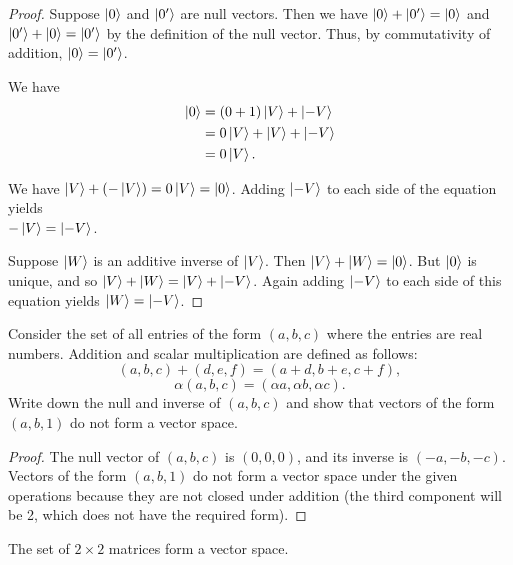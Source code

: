 \begin{enumerate}
    \item[] \begin{proof}
        \item[(a)] Suppose $\ket{0}$ and $\ket{0'}$ are null vectors. Then we have $\ket{0} + \ket{0'} = \ket{0}$ and $\ket{0'} + \ket{0} = \ket{0'}$ by the definition of the null vector. Thus, by commutativity of addition, $\ket{0} = \ket{0'}$.
        \item[(b)] We have
        \begin{align*}
            \ket{0} &= (0 + 1)\ket{V} + \ket{-V} \\
            &= 0\ket{V} + \ket{V} + \ket{-V} \\
            &= 0\ket{V}.
        \end{align*}
        \item[(c)] We have $\ket{V} + (-\ket{V}) = 0\ket{V} = \ket{0}$. Adding $\ket{-V}$ to each side of the equation yields \\$-\ket{V} = \ket{-V}$.
        \item[(d)] Suppose $\ket{W}$ is an additive inverse of $\ket{V}$. Then $\ket{V} + \ket{W} = \ket{0}$. But $\ket{0}$ is unique, and so $\ket{V} + \ket{W} = \ket{V} + \ket{-V}$. Again adding $\ket{-V}$ to each side of this equation yields $\ket{W} = \ket{-V} $.
    \end{proof}
\end{enumerate}

\begin{exercise}
Consider the set of all entries of the form $(a,b,c)$ where the entries are real numbers. Addition and scalar multiplication are defined as follows: $$(a, b, c) + (d, e, f) = (a + d, b + e, c + f),$$ $$\alpha(a, b, c) = (\alpha a, \alpha b, \alpha c).$$ Write down the null and inverse of $(a, b, c)$ and show that vectors of the form $(a, b, 1)$ do not form a vector space.
\end{exercise}

\begin{proof}
    The null vector of $(a, b, c)$ is $(0, 0, 0)$, and its inverse is $(-a, -b, -c)$. Vectors of the form $(a, b, 1)$ do not form a vector space under the given operations because they are not closed under addition (the third component will be 2, which does not have the required form).
\end{proof}

\begin{example}
The set of $2 \times 2$ matrices form a vector space.
\end{example}

